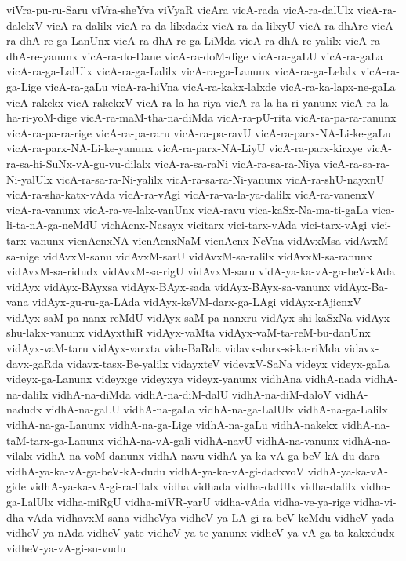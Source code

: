 {viVra-pu-ru-Saru
viVra-sheYva
viVyaR
vicAra
vicA-rada
vicA-ra-dalUlx
vicA-ra-dalelxV
vicA-ra-dalilx
vicA-ra-da-lilxdadx
vicA-ra-da-lilxyU
vicA-ra-dhAre
vicA-ra-dhA-re-ga-LanUnx
vicA-ra-dhA-re-ga-LiMda
vicA-ra-dhA-re-yalilx
vicA-ra-dhA-re-yanunx
vicA-ra-do-Dane
vicA-ra-doM-dige
vicA-ra-gaLU
vicA-ra-gaLa
vicA-ra-ga-LalUlx
vicA-ra-ga-Lalilx
vicA-ra-ga-Lanunx
vicA-ra-ga-Lelalx
vicA-ra-ga-Lige
vicA-ra-gaLu
vicA-ra-hiVna
vicA-ra-kakx-lalxde
vicA-ra-ka-lapx-ne-gaLa
vicA-rakekx
vicA-rakekxV
vicA-ra-la-ha-riya
vicA-ra-la-ha-ri-yanunx
vicA-ra-la-ha-ri-yoM-dige
vicA-ra-maM-tha-na-diMda
vicA-ra-pU-rita
vicA-ra-pa-ra-ranunx
vicA-ra-pa-ra-rige
vicA-ra-pa-raru
vicA-ra-pa-ravU
vicA-ra-parx-NA-Li-ke-gaLu
vicA-ra-parx-NA-Li-ke-yanunx
vicA-ra-parx-NA-LiyU
vicA-ra-parx-kirxye
vicA-ra-sa-hi-SuNx-vA-gu-vu-dilalx
vicA-ra-sa-raNi
vicA-ra-sa-ra-Niya
vicA-ra-sa-ra-Ni-yalUlx
vicA-ra-sa-ra-Ni-yalilx
vicA-ra-sa-ra-Ni-yanunx
vicA-ra-shU-nayxnU
vicA-ra-sha-katx-vAda
vicA-ra-vAgi
vicA-ra-va-la-ya-dalilx
vicA-ra-vanenxV
vicA-ra-vanunx
vicA-ra-ve-lalx-vanUnx
vicA-ravu
vica-kaSx-Na-ma-ti-gaLa
vica-li-ta-nA-ga-neMdU
vichAcnx-Nasayx
vicitarx
vici-tarx-vAda
vici-tarx-vAgi
vici-tarx-vanunx
vicnAcnxNA
vicnAcnxNaM
vicnAcnx-NeVna
vidAvxMsa
vidAvxM-sa-nige
vidAvxM-sanu
vidAvxM-sarU
vidAvxM-sa-ralilx
vidAvxM-sa-ranunx
vidAvxM-sa-ridudx
vidAvxM-sa-rigU
vidAvxM-saru
vidA-ya-ka-vA-ga-beV-kAda
vidAyx
vidAyx-BAyxsa
vidAyx-BAyx-sada
vidAyx-BAyx-sa-vanunx
vidAyx-Ba-vana
vidAyx-gu-ru-ga-LAda
vidAyx-keVM-darx-ga-LAgi
vidAyx-rAjicnxV
vidAyx-saM-pa-nanx-reMdU
vidAyx-saM-pa-nanxru
vidAyx-shi-kaSxNa
vidAyx-shu-lakx-vanunx
vidAyxthiR
vidAyx-vaMta
vidAyx-vaM-ta-reM-bu-danUnx
vidAyx-vaM-taru
vidAyx-varxta
vida-BaRda
vidavx-darx-si-ka-riMda
vidavx-davx-gaRda
vidavx-tasx-Be-yalilx
vidayxteV
videvxV-SaNa
videyx
videyx-gaLa
videyx-ga-Lanunx
videyxge
videyxya
videyx-yanunx
vidhAna
vidhA-nada
vidhA-na-dalilx
vidhA-na-diMda
vidhA-na-diM-dalU
vidhA-na-diM-daloV
vidhA-nadudx
vidhA-na-gaLU
vidhA-na-gaLa
vidhA-na-ga-LalUlx
vidhA-na-ga-Lalilx
vidhA-na-ga-Lanunx
vidhA-na-ga-Lige
vidhA-na-gaLu
vidhA-nakekx
vidhA-na-taM-tarx-ga-Lanunx
vidhA-na-vA-gali
vidhA-navU
vidhA-na-vanunx
vidhA-na-vilalx
vidhA-na-voM-danunx
vidhA-navu
vidhA-ya-ka-vA-ga-beV-kA-du-dara
vidhA-ya-ka-vA-ga-beV-kA-dudu
vidhA-ya-ka-vA-gi-dadxvoV
vidhA-ya-ka-vA-gide
vidhA-ya-ka-vA-gi-ra-lilalx
vidha
vidhada
vidha-dalUlx
vidha-dalilx
vidha-ga-LalUlx
vidha-miRgU
vidha-miVR-yarU
vidha-vAda
vidha-ve-ya-rige
vidha-vi-dha-vAda
vidhavxM-sana
vidheVya
vidheV-ya-LA-gi-ra-beV-keMdu
vidheV-yada
vidheV-ya-nAda
vidheV-yate
vidheV-ya-te-yanunx
vidheV-ya-vA-ga-ta-kakxdudx
vidheV-ya-vA-gi-su-vudu
}
